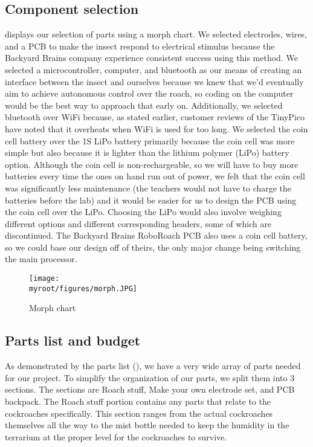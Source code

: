 \documentclass[twocolumn,10pt]{IEEEtran}
\newcommand{\myroot}{.}
\begin{document}
\subsection{Component selection}
 displays our selection of parts using a morph chart. We selected electrodes, wires, and a PCB to make the insect respond to electrical stimulus because the Backyard Brains company experience consistent success using this method. We selected a microcontroller, computer, and bluetooth as our means of creating an interface between the insect and ourselves because we knew that we'd eventually aim to achieve autonomous control over the roach, so coding on the computer would be the best way to approach that early on. Additionally, we selected bluetooth over WiFi because, as stated earlier, customer reviews of the TinyPico have noted that it overheats when WiFi is used for too long. We selected the coin cell battery over the 1S LiPo battery primarily because the coin cell was more simple but also because it is lighter than the lithium polymer (LiPo) battery option. Although the coin cell is non-rechargeable, so we will have to buy more batteries every time the ones on hand run out of power, we felt that the coin cell was significantly less maintenance (the teachers would not have to charge the batteries before the lab) and it would be easier for us to design the PCB using the coin cell over the LiPo. Choosing the LiPo would also involve weighing different options and different corresponding headers, some of which are discontinued. The Backyard Brains RoboRoach PCB also uses a coin cell battery, so we could base our design off of theirs, the only major change being switching the main processor.
\begin{figure}[ht!]
\centering
\texttt{[image: \\myroot/figures/morph.JPG]}
\caption{Morph chart}
\label{fig:morph}
\end{figure}

\subsection{Parts list and budget}
As demonstrated by the parts list (), we have a very wide array of parts needed for our project. To simplify the organization of our parts, we split them into 3 sections. The sections are Roach stuff, Make your own electrode set, and PCB backpack. The Roach stuff portion contains any parts that relate to the cockroaches specifically. This section ranges from the actual cockroaches themselves all the way to the mist bottle needed to keep the humidity in the terrarium at the proper level for the cockroaches to survive.
\end{document}
